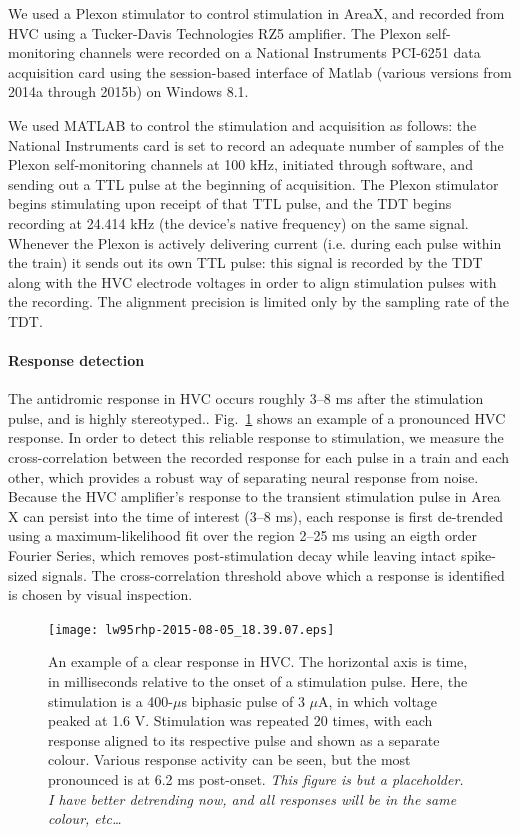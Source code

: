 \documentclass[10pt,letterpaper]{article}
\newcommand\fig[1]{Fig.~\ref{#1}}
\let\oldmarginpar\marginpar
\renewcommand{\marginpar}[1]{\oldmarginpar{\linespread{1}\scriptsize{#1}}}
\renewcommand{\subsubsection}[1]{\paragraph{#1}}
\begin{document}
We used a Plexon stimulator to control stimulation in AreaX, and recorded from HVC using a Tucker-Davis Technologies RZ5 amplifier.  The Plexon self-monitoring channels were recorded on a National Instruments PCI-6251 data acquisition card using the session-based interface of Matlab (various versions from 2014a through 2015b) on Windows 8.1.

We used MATLAB to control the stimulation and acquisition as follows: the National Instruments card is set to record an adequate number of samples of the Plexon self-monitoring channels at 100 kHz, initiated through software, and sending out a TTL pulse at the beginning of acquisition.  The Plexon stimulator begins stimulating upon receipt of that TTL pulse, and the TDT begins recording at 24.414 kHz (the device's native frequency) on the same signal.  Whenever the Plexon is actively delivering current (i.e. during each pulse within the train) it sends out its own TTL pulse: this signal is recorded by the TDT along with the HVC electrode voltages in order to align stimulation pulses with the recording.  The alignment precision is limited only by the sampling rate of the TDT.

\subsubsection{Response detection}

The antidromic response in HVC occurs roughly 3--8 ms after the stimulation pulse, and is highly stereotyped.\marginpar{[citation needed]}.  \fig{fig:clear_hvc_response} shows an example of a pronounced HVC response.  In order to detect this reliable response to stimulation, we measure the cross-correlation between the recorded response for each pulse in a train and each other, which provides a robust way of separating neural response from noise.  Because the HVC amplifier's response to the transient stimulation pulse in Area X can persist into the time of interest (3--8 ms), each response is first de-trended using a maximum-likelihood fit over the region 2--25 ms using an eigth order Fourier Series, which removes post-stimulation decay while leaving intact spike-sized signals.  The cross-correlation threshold above which a response is identified is chosen by visual inspection.

\begin{figure}
  \texttt{[image: lw95rhp-2015-08-05\_18.39.07.eps]}
  \caption{An example of a clear response in HVC.  The horizontal axis is time, in milliseconds relative to the onset of a stimulation pulse.  Here, the stimulation is a 400-$\mu$s biphasic pulse of 3 $\mu$A, in which voltage peaked at 1.6 V.  Stimulation was repeated 20 times, with each response aligned to its respective pulse and shown as a separate colour.  Various response activity can be seen, but the most pronounced is at 6.2 ms post-onset. {\em This figure is but a placeholder.  I have better detrending now, and all responses will be in the same colour, etc\dots}}
  \label{fig:clear_hvc_response}
\end{figure}
\end{document}
